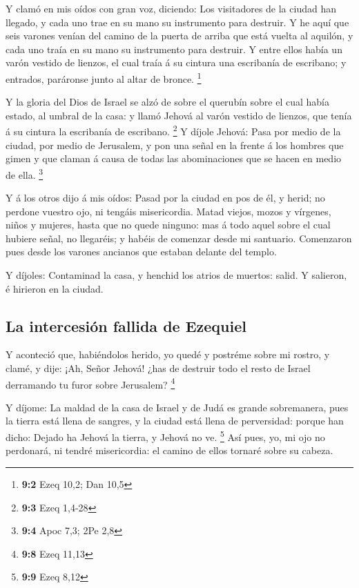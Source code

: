  Y clamó en mis oídos con gran voz, diciendo: Los
visitadores de la ciudad han llegado, y cada uno trae en su mano su
instrumento para destruir.  Y he aquí que seis varones
venían del camino de la puerta de arriba que está vuelta al aquilón, y
cada uno traía en su mano su instrumento para destruir. Y entre ellos
había un varón vestido de lienzos, el cual traía á su cintura una
escribanía de escribano; y entrados, paráronse junto al altar de bronce.
\footnote{\textbf{9:2} Ezeq 10,2; Dan 10,5}

 Y la gloria del Dios de Israel se alzó de sobre el
querubín sobre el cual había estado, al umbral de la casa: y llamó
Jehová al varón vestido de lienzos, que tenía á su cintura la escribanía
de escribano. \footnote{\textbf{9:3} Ezeq 1,4-28}  Y
díjole Jehová: Pasa por medio de la ciudad, por medio de Jerusalem, y
pon una señal en la frente á los hombres que gimen y que claman á causa
de todas las abominaciones que se hacen en medio de ella. \footnote{\textbf{9:4}
  Apoc 7,3; 2Pe 2,8}

 Y á los otros dijo á mis oídos: Pasad por la ciudad en
pos de él, y herid; no perdone vuestro ojo, ni tengáis misericordia.
 Matad viejos, mozos y vírgenes, niños y mujeres, hasta
que no quede ninguno: mas á todo aquel sobre el cual hubiere señal, no
llegaréis; y habéis de comenzar desde mi santuario. Comenzaron pues
desde los varones ancianos que estaban delante del templo.

 Y díjoles: Contaminad la casa, y henchid los atrios de
muertos: salid. Y salieron, é hirieron en la ciudad.

\hypertarget{la-intercesiuxf3n-fallida-de-ezequiel}{%
\subsection{La intercesión fallida de
Ezequiel}\label{la-intercesiuxf3n-fallida-de-ezequiel}}

 Y aconteció que, habiéndolos herido, yo quedé y postréme
sobre mi rostro, y clamé, y dije: ¡Ah, Señor Jehová! ¿has de destruir
todo el resto de Israel derramando tu furor sobre Jerusalem? \footnote{\textbf{9:8}
  Ezeq 11,13}

 Y díjome: La maldad de la casa de Israel y de Judá es
grande sobremanera, pues la tierra está llena de sangres, y la ciudad
está llena de perversidad: porque han dicho: Dejado ha Jehová la tierra,
y Jehová no ve. \footnote{\textbf{9:9} Ezeq 8,12}  Así
pues, yo, mi ojo no perdonará, ni tendré misericordia: el camino de
ellos tornaré sobre su cabeza.

